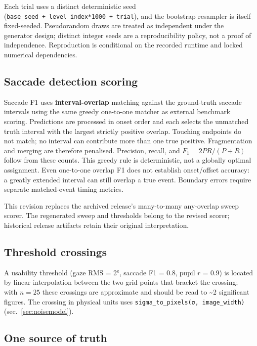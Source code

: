 \documentclass[
]{article}
\begin{document}
Each trial uses a distinct deterministic seed
(\texttt{base\_seed\ +\ level\_index*1000\ +\ trial}), and the bootstrap
resampler is itself fixed-seeded. Pseudorandom draws are treated as
independent under the generator design; distinct integer seeds are a
reproducibility policy, not a proof of independence. Reproduction is
conditional on the recorded runtime and locked numerical dependencies.

\subsection{Saccade detection scoring}\label{saccade-detection-scoring}

Saccade F1 uses \textbf{interval-overlap} matching against the
ground-truth saccade intervals using the same greedy one-to-one matcher
as external benchmark scoring. Predictions are processed in onset order
and each selects the unmatched truth interval with the largest strictly
positive overlap. Touching endpoints do not match; no interval can
contribute more than one true positive. Fragmentation and merging are
therefore penalised. Precision, recall, and \(F_1 = 2PR/(P+R)\) follow
from these counts. This greedy rule is deterministic, not a globally
optimal assignment. Even one-to-one overlap F1 does not establish
onset/offset accuracy: a greatly extended interval can still overlap a
true event. Boundary errors require separate matched-event timing
metrics.

This revision replaces the archived release's many-to-many any-overlap
sweep scorer. The regenerated sweep and thresholds belong to the revised
scorer; historical release artifacts retain their original
interpretation.

\subsection{Threshold crossings}\label{threshold-crossings}

A usability threshold (gaze RMS = 2°, saccade F1 = 0.8, pupil \(r\) =
0.9) is located by linear interpolation between the two grid points that
bracket the crossing; with \(n=25\) these crossings are approximate and
should be read to \textasciitilde2 significant figures. The crossing in
physical units uses \texttt{sigma\_to\_pixels(σ,\ image\_width)}
(sec.~\ref{sec:noisemodel}).

\subsection{One source of truth}\label{one-source-of-truth}
\end{document}
